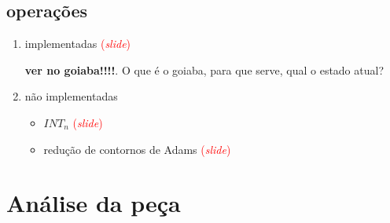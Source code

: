\documentclass[12pt,a4paper]{article}
\newcommand{\slide}{\textcolor{red}{(\textit{slide})}}
\begin{document}
\subsection{operações}

\begin{enumerate}
\item implementadas \slide{}

  \textbf{ver no goiaba!!!!}. O que é o goiaba, para que serve, qual o
  estado atual?
\item não implementadas
  \begin{itemize}
  \item $INT_n$ \slide{}
  \item redução de contornos de Adams \slide{}
  \end{itemize}
\end{enumerate}

\section{Análise da peça}
\end{document}
